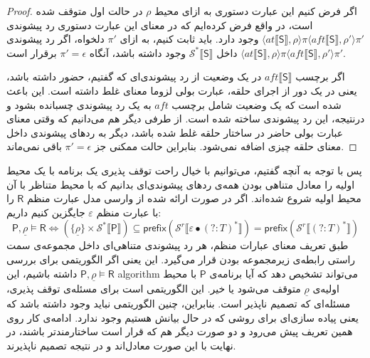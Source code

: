 \begin{proof}
اگر فرض کنیم این عبارت‌ دستوری به ازای محیط $\rho$ در حالت اول متوقف شده است، در واقع فرض کرده‌ایم که در معنای این عبارت‌ دستوری رد پیشوندی 
$\langle at \llbracket \mathsf{S} \rrbracket , \rho \rangle \pi \langle aft \llbracket \mathsf{S} \rrbracket , \rho' \rangle \pi'$ 
وجود دارد.
باید ثابت کنیم، به ازای $\pi'$ دلخواه، اگر رد پیشوندی
$\langle at \llbracket \mathsf{S} \rrbracket , \rho \rangle \pi \langle aft \llbracket \mathsf{S} \rrbracket , \rho' \rangle \pi'$ 
داخل 
$\mathcal{S^*}\llbracket \mathsf{S} \rrbracket$
وجود داشته باشد، آنگاه
$\pi'=\epsilon$
برقرار است.

اگر برچسب
$aft \llbracket \mathsf{S} \rrbracket$
در یک وضعیت از رد پیشوندی‌ای که گفتیم، حضور داشته باشد، یعنی در یک دور از اجرای حلقه، عبارت بولی لزوما معنای غلط داشته است. این باعث شده است که یک وضعیت شامل برچسب $aft$ به یک رد پیشوندی چسبانده بشود و درنتیجه، این رد پیشوندی ساخته شده است. از طرفی دیگر هم می‌دانیم که وقتی معنای عبارت بولی حاضر در ساختار حلقه غلط شده باشد، دیگر به ردهای پیشوندی داخل معنای حلقه چیزی اضافه نمی‌شود. بنابراین حالت ممکنی جز $\pi'=\epsilon$ باقی نمی‌ماند. 
\end{proof}

پس با توجه به آنچه گفتیم، می‌توانیم با خیال راحت توقف پذیری یک برنامه با یک محیط اولیه را معادل متناهی بودن همه‌ی ردهای پیشوندی‌ای بدانیم که با محیط متناظر با آن محیط اولیه شروع شده‌اند.
اگر در صورت ارائه شده از وارسی مدل عبارت منظم $\mathsf{R}$ را با عبارت منظم $\varepsilon$ جایگزین کنیم داریم:
$$\mathsf{P},\underline{\rho} \models \mathsf{R}
\Leftrightarrow
(\{\underline{\rho}\}\times \mathcal{S}^* \llbracket \mathsf{P}\rrbracket) \subseteq 
\mathsf{prefix} (\mathcal{S}^r \llbracket \varepsilon \bullet (?:\mathit{T})^*\rrbracket)
=\mathsf{prefix} (\mathcal{S}^r \llbracket (?:\mathit{T})^*\rrbracket)$$
طبق تعریف معنای عبارات منظم، هر رد پیشوندی متناهی‌ای داخل مجموعه‌ی سمت راستی رابطه‌ی زیرمجموعه بودن قرار می‌گیرد. این یعنی اگر الگوریتمی برای بررسی 
$\mathsf{P} , \underline{\rho} \models \mathsf{R} $
داشته باشیم، این \gls*{algorithm} می‌تواند تشخیص دهد که آیا برنامه‌ی $\mathsf{P}$ با محیط اولیه‌ی $\underline{\rho}$ متوقف می‌شود یا خیر. این الگوریتمی است برای مسئله‌ی توقف پذیری، مسئله‌ای که تصمیم ناپذیر است. بنابراین، چنین الگوریتمی نباید وجود داشته باشد که یعنی پیاده سازی‌ای برای روشی که در حال بیانش هستیم وجود ندارد. ادامه‌ی کار روی همین تعریف پیش می‌رود و دو صورت دیگر هم که قرار است ساختارمندتر باشند، در نهایت با این صورت معادل‌اند و در نتیجه تصمیم ناپذیرند.














